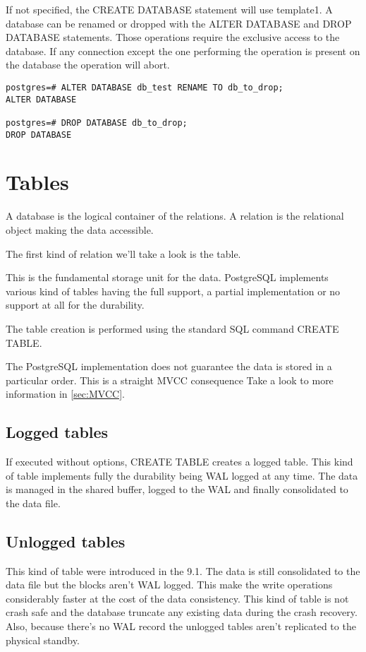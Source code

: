 If not specified, the CREATE DATABASE  statement will use template1. 
A database can be renamed or dropped with the ALTER DATABASE and DROP DATABASE 
statements. Those operations require the exclusive access to the database. If 
any connection except the one performing the operation is present on the 
database the operation will abort.


\begin{lstlisting}[style=pgsql]
postgres=# ALTER DATABASE db_test RENAME TO db_to_drop;
ALTER DATABASE

postgres=# DROP DATABASE db_to_drop;
DROP DATABASE

\end{lstlisting}




\section{Tables}
\label{sec:TABLES}
A database is the logical container of the relations.
A relation is the relational object making the data accessible.

The first kind of relation we'll take a look is the table.

This is the fundamental storage unit for the data. PostgreSQL implements 
various kind of tables having the full support, a partial implementation or no 
support at all for the durability.

The table creation is performed using the standard SQL command CREATE TABLE. 

The PostgreSQL implementation does not guarantee the data is stored in a 
particular order. This is a straight MVCC consequence Take a look to 
more information in \ref{sec:MVCC}. 

\subsection{Logged tables}
If executed without options, CREATE TABLE creates a logged table. This kind of 
table implements fully the durability being WAL logged at any time. The data is 
managed in the shared buffer, logged to the WAL and finally consolidated to the 
data file. 

\subsection{Unlogged tables}
\label{sub:UNLOGGEDTABLES}
This kind of table were introduced in the 9.1. The data is still consolidated 
to the data file but the blocks aren't WAL logged. This make the write 
operations considerably faster at the cost of the data consistency. This kind 
of table is not crash safe and the database truncate any existing data during 
the crash recovery. Also, because there's no WAL record the unlogged tables 
aren't replicated to the physical standby. 

